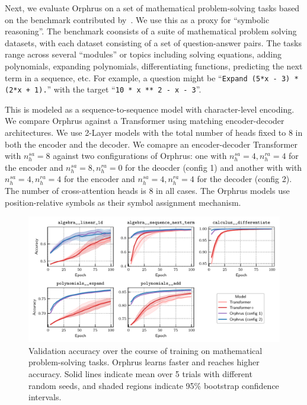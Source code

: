 Next, we evaluate Orphrus on a set of mathematical problem-solving tasks based on the benchmark contributed by~\citet{saxtonAnalyzingMathematicalReasoning2019}. We use this as a proxy for ``symbolic reasoning''. The benchmark coonsists of a suite of mathematical problem solving datasets, with each dataset consisting of a set of question-answer pairs. The tasks range across several ``modules'' or topics including solving equations, adding polynomials, expanding polynomials, differentiating functions, predicting the next term in a sequence, etc. For example, a question might be ``\texttt{Expand (5*x - 3) * (2*x + 1).}'' with the target ``\texttt{10 * x ** 2 - x - 3}''.

This is modeled as a sequence-to-sequence model with character-level encoding. We compare Orphrus against a Transformer using matching encoder-decoder architectures. We use 2-Layer models with the total number of heads fixed to $8$ in both the encoder and the decoder. We comapre an encoder-decoder Transformer with $n_h^{sa} = 8$ against two configurations of Orphrus: one with $n_h^{sa} = 4, n_h^{ra} = 4$ for the encoder and $n_h^{sa} = 8, n_h^{ra} = 0$ for the deocder (config 1) and another with with $n_h^{sa} = 4, n_h^{ra} = 4$ for the encoder and $n_h^{sa} = 4, n_h^{ra} = 4$ for the decoder (config 2). The number of cross-attention heads is $8$ in all cases. The Orphrus models use position-relative symbols as their symbol assignment mechanism.

\begin{figure}
    \includegraphics[width=\textwidth]{figs/experiments/math/math_training_curves_interpolation.pdf}
    \caption{Validation accuracy over the course of training on mathematical problem-solving tasks. Orphrus learns faster and reaches higher accuracy. Solid lines indicate mean over 5 trials with different random seeds, and shaded regions indicate 95\% bootstrap confidence intervals.}\label{fig:math_training_curves_interpolation}
\end{figure}

